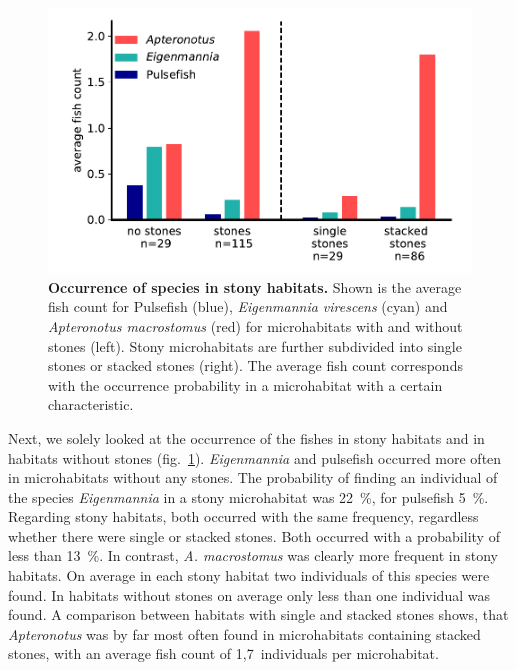 \begin{figure}[H]
    \centering
    \includegraphics[width = \textwidth]{pictures/Results/more_stones_pls.pdf}
    \caption{\textbf{Occurrence of species in stony habitats.} Shown is the average fish count for Pulsefish (blue), \textit{Eigenmannia virescens} (cyan) and \textit{Apteronotus macrostomus} (red) for microhabitats with and without stones (left). Stony microhabitats are further subdivided into single stones or stacked stones (right). The average fish count corresponds with the occurrence probability in a microhabitat with a certain characteristic.}
    \label{fig:habitat_count_stones}
\end{figure}

Next, we solely looked at the occurrence of the fishes in stony habitats and in habitats without stones (fig.~\ref{fig:habitat_count_stones}). \textit{Eigenmannia} and pulsefish occurred more often in microhabitats without any stones. The probability of finding an individual of the species \textit{Eigenmannia} in a stony microhabitat was 22~\%, for pulsefish 5~\%. Regarding stony habitats, both occurred with the same frequency, regardless whether there were single or stacked stones. Both occurred with a probability of less than 13~\%. In contrast, \textit{A. macrostomus} was clearly more frequent in stony habitats. On average in each stony habitat two individuals of this species were found. In habitats without stones on average only less than one individual was found. A comparison between habitats with single and stacked stones shows, that \textit{Apteronotus} was by far most often found in microhabitats containing stacked stones, with an average fish count of 1,7~individuals per microhabitat.

